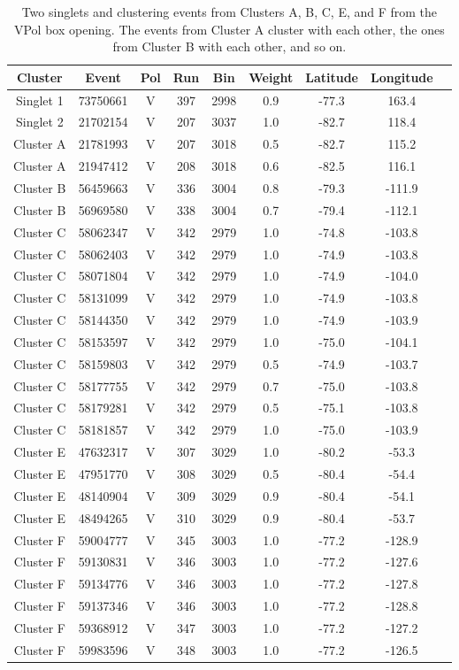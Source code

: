 \begin{table}
\centering
\begin{tabular}{ |c|c|c|c|c|c|c|c|c| } 
\hline
Cluster & Event & Pol & Run & Bin & Weight & Latitude & Longitude\\
\hline
Singlet 1 & 73750661 & V & 397 & 2998 & 0.9 & -77.3 & 163.4\\
Singlet 2 & 21702154 & V & 207 & 3037 & 1.0 & -82.7 & 118.4\\
Cluster A & 21781993 & V & 207 & 3018 & 0.5 & -82.7 & 115.2\\
Cluster A & 21947412 & V & 208 & 3018 & 0.6 & -82.5 &  116.1\\
Cluster B & 56459663 & V & 336 & 3004 & 0.8 & -79.3 & -111.9\\
Cluster B & 56969580 & V & 338 & 3004 & 0.7 & -79.4 & -112.1\\
Cluster C & 58062347 & V & 342 & 2979 & 1.0 & -74.8 & -103.8\\
Cluster C & 58062403 & V & 342 & 2979 & 1.0 & -74.9 & -103.8\\
Cluster C & 58071804 & V & 342 & 2979 & 1.0 & -74.9 & -104.0\\
Cluster C & 58131099 & V & 342 & 2979 & 1.0 & -74.9 & -103.8\\
Cluster C & 58144350 & V & 342 & 2979 & 1.0 & -74.9 & -103.9\\
Cluster C & 58153597 & V & 342 & 2979 & 1.0 & -75.0 & -104.1\\
Cluster C & 58159803 & V & 342 & 2979 & 0.5 & -74.9 & -103.7\\
Cluster C & 58177755 & V & 342 & 2979 & 0.7 & -75.0 & -103.8\\
Cluster C & 58179281 & V & 342 & 2979 & 0.5 & -75.1 & -103.8\\
Cluster C & 58181857 & V & 342 & 2979 & 1.0 & -75.0 & -103.9\\
Cluster E & 47632317 & V & 307 & 3029 & 1.0 & -80.2 & -53.3\\
Cluster E & 47951770 & V & 308 & 3029 & 0.5 & -80.4 & -54.4\\
Cluster E & 48140904 & V & 309 & 3029 & 0.9 & -80.4 & -54.1\\
Cluster E & 48494265 & V & 310 & 3029 & 0.9 & -80.4 & -53.7\\
Cluster F & 59004777 & V & 345 & 3003 & 1.0 & -77.2 & -128.9\\
Cluster F & 59130831 & V & 346 & 3003 & 1.0 & -77.2 & -127.6\\
Cluster F & 59134776 & V & 346 & 3003 & 1.0 & -77.2 & -127.8\\
Cluster F & 59137346 & V & 346 & 3003 & 1.0 & -77.2 & -128.8\\
Cluster F & 59368912 & V & 347 & 3003 & 1.0 & -77.2 & -127.2\\
Cluster F & 59983596 & V & 348 & 3003 & 1.0 & -77.2 & -126.5\\
\hline
\end{tabular}
\caption{Two singlets and clustering events from Clusters A, B, C, E, and F from the VPol box opening. The events from Cluster A cluster with each other, the ones from Cluster B with each other, and so on. }
\label{vpol_cluster}
\end{table}

